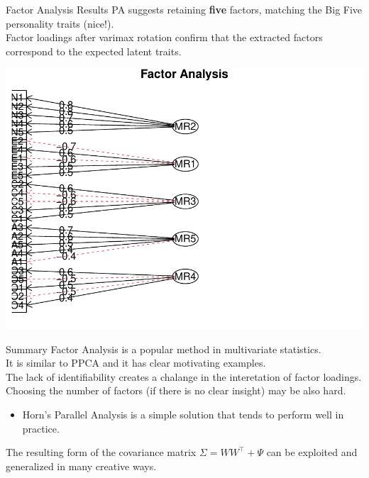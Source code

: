 \documentclass[11pt,handout,aspectratio=169]{beamer}
\begin{document}
\begin{frame}{Factor Analysis Results}
\alert{PA} suggests retaining \textbf{five} factors, matching the Big Five personality traits (nice!).\\[4mm]
Factor loadings after \alert{varimax rotation} confirm that the extracted factors correspond to the expected latent traits.
\begin{center}
    \includegraphics[width=0.3\linewidth]{pics/FA.pdf}	
\end{center}
\end{frame}

\begin{frame}{Summary}
	Factor Analysis is a popular method in multivariate statistics. \\[4mm]
	It is similar to PPCA and it has clear motivating examples. \\[4mm]
	The lack of identifiability creates a chalange in the interetation of factor loadings.\\[4mm]
	Choosing the number of factors (if there is no clear insight) may be also hard. 
	\begin{itemize}
		\item Horn's Parallel Analysis is a simple solution that tends to perform well in practice.\\[4mm]
	\end{itemize}
	The resulting form of the covariance matrix $\Sigma=WW^\top +\Psi$ can be exploited and generalized in many creative ways. 
\end{frame}
\end{document}
